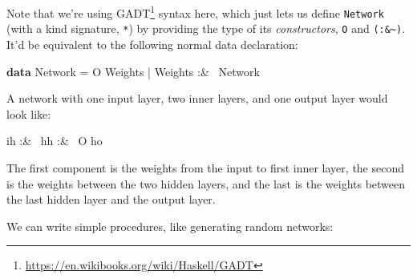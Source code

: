 \documentclass[]{article}
\newenvironment{Shaded}{\begin{snugshade}}{\end{snugshade}}
\newcommand{\DataTypeTok}[1]{\textcolor[rgb]{0.13,0.29,0.53}{#1}}
\newcommand{\FunctionTok}[1]{\textcolor[rgb]{0.00,0.00,0.00}{#1}}
\newcommand{\KeywordTok}[1]{\textcolor[rgb]{0.13,0.29,0.53}{\textbf{#1}}}
\newcommand{\NormalTok}[1]{#1}
\renewcommand{\href}[2]{#2\footnote{\url{#1}}}
\begin{document}
Note that we're using \href{https://en.wikibooks.org/wiki/Haskell/GADT}{GADT}
syntax here, which just lets us define \texttt{Network} (with a kind signature,
\texttt{*}) by providing the type of its \emph{constructors}, \texttt{O} and
\texttt{(:\&\textasciitilde{})}. It'd be equivalent to the following normal data
declaration:

\begin{Shaded}
\begin{Highlighting}[]
\KeywordTok{data} \DataTypeTok{Network} \FunctionTok{=} \DataTypeTok{O} \DataTypeTok{Weights}
             \FunctionTok{|} \DataTypeTok{Weights} \FunctionTok{:&~} \DataTypeTok{Network}
\end{Highlighting}
\end{Shaded}

A network with one input layer, two inner layers, and one output layer would
look like:

\begin{Shaded}
\begin{Highlighting}[]
\NormalTok{ih }\FunctionTok{:&~}\NormalTok{ hh }\FunctionTok{:&~} \DataTypeTok{O}\NormalTok{ ho}
\end{Highlighting}
\end{Shaded}

The first component is the weights from the input to first inner layer, the
second is the weights between the two hidden layers, and the last is the weights
between the last hidden layer and the output layer.

We can write simple procedures, like generating random networks:
\end{document}
